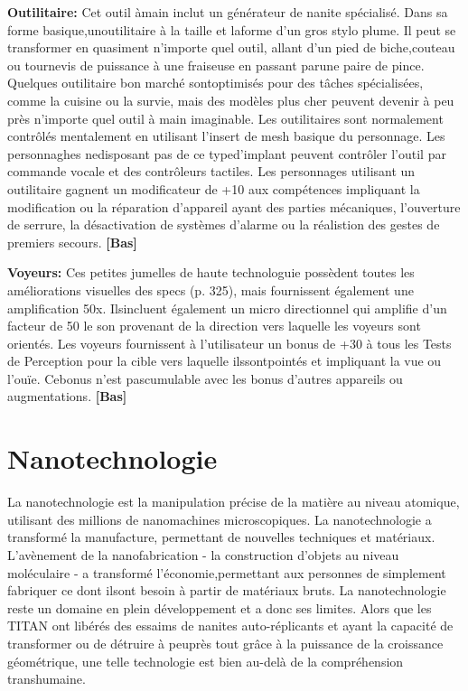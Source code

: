\textbf{Outilitaire:} Cet outil àmain inclut un générateur de nanite spécialisé. Dans sa forme basique,unoutilitaire à la taille et laforme d'un gros stylo plume. Il peut se transformer en quasiment n'importe quel outil, allant d'un pied de biche,couteau ou tournevis de puissance à une fraiseuse en passant parune paire de pince. Quelques outilitaire bon marché sontoptimisés pour des tâches spécialisées, comme la cuisine ou la survie, mais des modèles plus cher peuvent devenir à peu près n'importe quel outil à main imaginable. Les outilitaires sont normalement contrôlés mentalement en utilisant l'insert de mesh basique du personnage. Les personnaghes nedisposant pas de ce typed'implant peuvent contrôler l'outil par commande vocale et des contrôleurs tactiles. Les personnages utilisant un outilitaire gagnent un modificateur de +10 aux compétences impliquant la modification ou la réparation d'appareil ayant des parties mécaniques, l'ouverture de serrure, la désactivation de systèmes d'alarme ou la réalistion des gestes de premiers secours. \textbf{[Bas]} 

\textbf{Voyeurs:} Ces petites jumelles de haute technologuie possèdent toutes les améliorations visuelles des specs (p. 325), mais fournissent également une amplification 50x. Ilsincluent également un micro directionnel qui amplifie d'un facteur de 50 le son provenant de la direction vers laquelle les voyeurs sont orientés. Les voyeurs fournissent à l'utilisateur un bonus de +30 à tous les Tests de Perception pour la cible vers laquelle ilssontpointés et impliquant la vue ou l'ouïe. Cebonus n'est pascumulable avec les bonus d'autres appareils ou augmentations. \textbf{[Bas]} 



\section{Nanotechnologie} \label{sec:nanotech} 

La nanotechnologie est la manipulation précise de la matière au niveau atomique, utilisant des millions de nanomachines microscopiques. La nanotechnologie a transformé la manufacture, permettant de nouvelles techniques et matériaux. L'avènement de la nanofabrication - la construction d'objets au niveau moléculaire - a transformé l'économie,permettant aux personnes de simplement fabriquer ce dont ilsont besoin à partir de matériaux bruts. La nanotechnologie reste un domaine en plein développement et a donc ses limites. Alors que les TITAN ont libérés des essaims de nanites auto-réplicants et ayant la capacité de transformer ou de détruire à peuprès tout grâce à la puissance de la croissance géométrique, une telle technologie est bien au-delà de la compréhension transhumaine. 



